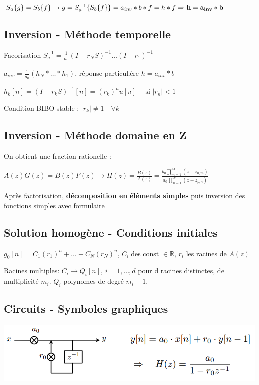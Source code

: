 $S_a\{g\} = S_b\{f\} \rightarrow g = S_a^{-1}\{S_b\{f\}\} = a_{inv}*b*f=h*f\\
\Rightarrow \mathbf{h = a_{inv} * b}$

\subsection*{Inversion - Méthode temporelle}

Facorisation $S_a^{-1} = \frac{1}{a_0}(I-r_NS)^{-1}\dots(I-r_1)^{-1}$

$a_{inv} = \frac{1}{a_0} (h_N*\dots*h_1)$, réponse particulière $h=a_{inv}*b$

$h_k[n] = (I-r_kS)^{-1}[n]=(r_k)^nu[n] \quad\text{ si } |r_n|<1$

Condition BIBO-stable : $|r_k| \neq 1 \quad \forall k$

\subsection*{Inversion - Méthode domaine en Z}

On obtient une fraction rationelle :

$A(z)G(z)=B(z)F(z) \rightarrow H(z) = \frac{B(z)}{A(z)} = \frac{b_0 \prod_{m=1}^M(z-z_{0,m})}{a_0 \prod_{n=1}^N (z-z_{p,n})}$ 

Après factorisation, \textbf{décomposition en éléments simples} puis inversion des fonctions simples avec formulaire

\subsection*{Solution homogène - Conditions initiales}


$g_0[n] = C_1(r_1)^n + \dots + C_N(r_N)^n$, $C_i$ des const $\in\mathbb{R}$, $r_i$ les racines de $A(z)$

Racines multiples: $C_i \rightarrow Q_i[n]$, $i = 1,\dots,d$ pour d racines distinctes, de multiplicité $m_i$. $Q_i$ polynomes de degré $m_i-1$.

\subsection*{Circuits - Symboles graphiques}

\begin{Figure}
    \centering
    \includegraphics[width=\linewidth]{res/implementation-symboles.png}
\end{Figure}

